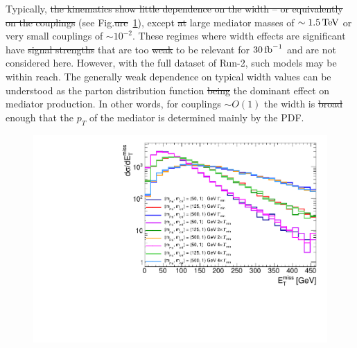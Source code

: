 
Typically, \sout{the kinematics show little dependence on the width -- or equivalently on the couplings}   (see Fig.\sout{ure}~\ref{fig:widthsmallscan}), except \sout{at}  large mediator masses of $\sim 1.5\,{\rm TeV}$ or  very small couplings of $\sim 10^{-2}$. These regimes where width effects are significant have \sout{signal strengths}  that are too \sout{weak}  to be relevant for $30\,{\rm fb}^{-1}$ and are not considered here. However, with the full dataset of Run-2, such models may be within reach. The generally weak dependence on typical width values can be understood as the parton distribution function \sout{being}  the dominant effect on mediator production. In other words, for couplings $\sim O(1)$ the width is \sout{broad}  enough that the $p_T$ of the mediator is determined mainly by the PDF.

\begin{figure}[!ht]
  \begin{center}
    \includegraphics[scale=0.45]{figures/MEt_smallwidth.pdf}
    \vspace{2mm}
    \caption{\label{fig:widthsmallscan} 
    }
\end{center}
\end{figure}

